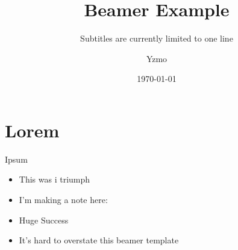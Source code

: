 \documentclass[aspectratio=169]{beamer}
\title[RIXS]{Beamer Example}
\author{Yzmo}
\subtitle{Subtitles are currently limited to one line}
\date{\today}
\institute{Lund University\\Department of Portals}
\begin{document}
\titleframe

\section{Lorem}
\begin{frame}{Ipsum}
			\begin{itemize}
				\item This was i triumph
				\item I'm making a note here:
				\item Huge Success
				\item It's hard to overstate this beamer template
			\end{itemize}
\end{frame}
\end{document}
